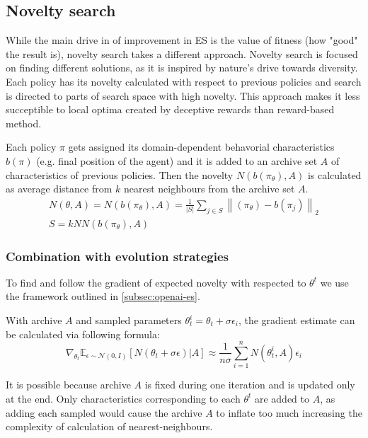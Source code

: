 \subsection{Novelty search}

While the main drive in of improvement in ES is the value of fitness (how "good" the result is), novelty search takes a different approach. Novelty search is focused on finding different solutions, as it is inspired by nature's drive towards diversity. Each policy has its novelty calculated with respect to previous policies and search is directed to parts of search space with high novelty. This approach makes it less succeptible to local optima created by deceptive rewards than reward-based method. 

Each policy $\pi$ gets assigned its domain-dependent behavorial characteristics $b(\pi)$ (e.g. final position of the agent) and it is added to an archive set $A$ of characteristics of previous policies. Then the novelty $N(b(\pi_\theta), A)$ is calculated as average distance from $k$ nearest neighbours from the archive set $A$.
\begin{equation}
    \begin{gathered}        
    N(\theta,A) = N(b(\pi_\theta),A)=\frac{1}{\left\lvert S\right\rvert }\sum_{j\in S} \left\lVert(\pi_\theta)-b(\pi_j) \right\rVert_2  \\
    S = kNN(b(\pi_\theta),A)
\end{gathered} 
\end{equation}
\subsubsection{Combination with evolution strategies}

To find and follow the gradient of expected novelty with respected to $\theta^t$ we use the framework outlined in \ref{subsec:openai-es}. 

With archive $A$ and sampled parameters $\theta_t^i=\theta_t + \sigma\epsilon_i$, the gradient estimate can be calculated via following formula:
\begin{equation}
    \label{nes:grad}
    \nabla_{\theta_t}\mathbb{E}_{\epsilon\sim\mathcal{N}(0,I)} [ N(\theta_t + \sigma\epsilon)|A]\approx \frac{1}{n\sigma}\sum_{i=1}^n N(\theta_t^i,A)\epsilon_i 
\end{equation}

It is possible because archive $A$ is fixed during one iteration and is updated only at the end. Only characteristics corresponding to each $\theta^t$ are added to $A$, as adding each sampled would cause the archive $A$ to inflate too much increasing the complexity of calculation of nearest-neighbours.


